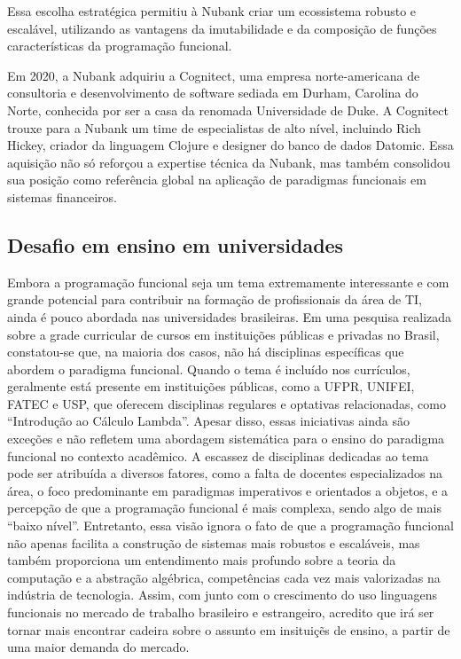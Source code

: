  Essa escolha estratégica permitiu à Nubank criar um ecossistema robusto e escalável, utilizando as vantagens da imutabilidade e da composição de funções características da programação funcional.

Em 2020, a Nubank adquiriu a Cognitect, uma empresa norte-americana de consultoria e desenvolvimento de software sediada em Durham, Carolina do Norte, conhecida por ser a casa da renomada Universidade de Duke. A Cognitect trouxe para a Nubank um time de especialistas de alto nível, incluindo Rich Hickey, criador da linguagem Clojure e designer do banco de dados Datomic. Essa aquisição não só reforçou a expertise técnica da Nubank, mas também consolidou sua posição como referência global na aplicação de paradigmas funcionais em sistemas financeiros.

\subsection{Desafio em ensino em universidades}

Embora a programação funcional seja um tema extremamente interessante e com grande potencial para contribuir na formação de profissionais da área de TI, ainda é pouco abordada nas universidades brasileiras. Em uma pesquisa realizada sobre a grade curricular de cursos em instituições públicas e privadas no Brasil, constatou-se que, na maioria dos casos, não há disciplinas específicas que abordem o paradigma funcional.
Quando o tema é incluído nos currículos, geralmente está presente em instituições públicas, como a UFPR, UNIFEI, FATEC e USP, que oferecem disciplinas regulares e optativas relacionadas, como “Introdução ao Cálculo Lambda”. Apesar disso, essas iniciativas ainda são exceções e não refletem uma abordagem sistemática para o ensino do paradigma funcional no contexto acadêmico.
A escassez de disciplinas dedicadas ao tema pode ser atribuída a diversos fatores, como a falta de docentes especializados na área, o foco predominante em paradigmas imperativos e orientados a objetos, e a percepção de que a programação funcional é mais complexa, sendo algo de mais “baixo nível”. Entretanto, essa visão ignora o fato de que a programação funcional não apenas facilita a construção de sistemas mais robustos e escaláveis, mas também proporciona um entendimento mais profundo sobre a teoria da computação e a abstração algébrica, competências cada vez mais valorizadas na indústria de tecnologia. Assim, com junto com o crescimento do uso linguagens funcionais no mercado de trabalho brasileiro e estrangeiro, acredito que irá ser tornar mais encontrar cadeira sobre o assunto em insituiçẽs de ensino, a partir de uma maior demanda do mercado. 


